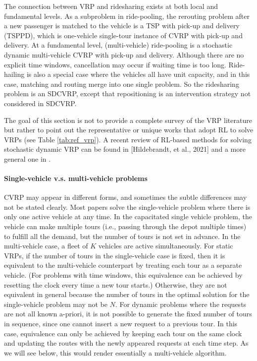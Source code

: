 \documentclass{article}
\begin{document}
The connection between VRP and ridesharing exists at both local and fundamental levels. As a subproblem in ride-pooling, the rerouting problem after a new passenger is matched to the vehicle is a TSP with pick-up and delivery (TSPPD), which is one-vehicle single-tour instance of CVRP with pick-up and delivery.  At a fundamental level, (multi-vehicle) ride-pooling is a stochastic dynamic multi-vehicle CVRP with pick-up and delivery. Although there are no explicit time windows, cancellation may occur if waiting time is too long. Ride-hailing is also a special case where the vehicles all have unit capacity, and in this case, matching and routing merge into one single problem. So the ridesharing problem is an SDCVRP, except that repositioning is an intervention strategy not considered in SDCVRP.

The goal of this section is not to provide a complete survey of the VRP literature but rather to point out the representative or unique works that adopt RL to solve VRPs (see Table \ref{tab:ref_vrp}).
A recent review of RL-based methods for solving stochastic dynamic VRP can be found in [Hildebrandt, et al., 2021] and a more general one in \citep{ulmer2020modeling}.

\paragraph{Single-vehicle v.s. multi-vehicle problems}
CVRP may appear in different forms, and sometimes the subtle differences may not be stated clearly.
Most papers solve the single-vehicle problem where there is only one active vehicle at any time. In the capacitated single vehicle problem, the vehicle can make multiple tours (i.e., passing through the depot multiple times) to fulfill all the demand, but the number of tours is not set in advance. In the multi-vehicle case, a fleet of $K$ vehicles are active simultaneously. For static VRPs, if the number of tours in the single-vehicle case is fixed, then it is equivalent to the multi-vehicle counterpart by treating each tour as a separate vehicle. (For problems with time windows, this equivalence can be achieved by resetting the clock every time a new tour starts.) Otherwise, they are not equivalent in general because the number of tours in the optimal solution for the single-vehicle problem may not be $N$. For dynamic problems where the requests are not all known a-priori, it is not possible to generate the fixed number of tours in sequence, since one cannot insert a new request to a previous tour. In this case, equivalence can only be achieved by keeping each tour on the same clock and updating the routes with the newly appeared requests at each time step. As we will see below, this would render essentially a multi-vehicle algorithm.
\end{document}
